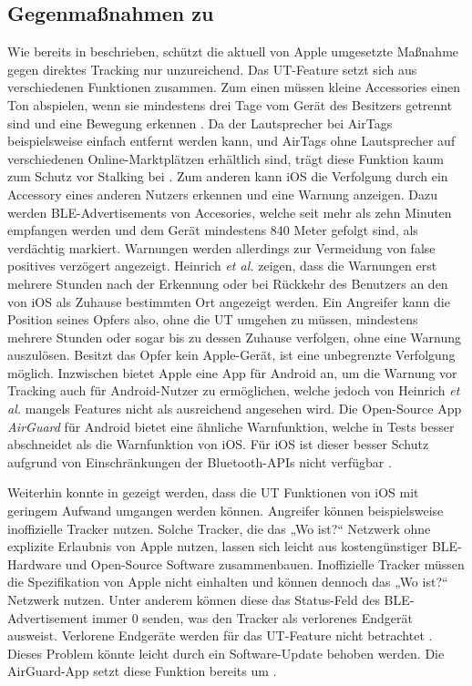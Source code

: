 \subsection{Gegenmaßnahmen zu }

Wie bereits in  beschrieben, schützt die aktuell von Apple umgesetzte Maßnahme gegen direktes Tracking nur unzureichend.
Das \ac{UT}-Feature setzt sich aus verschiedenen Funktionen zusammen.
Zum einen müssen kleine Accessories einen Ton abspielen, wenn sie mindestens drei Tage vom Gerät des Besitzers getrennt sind und eine Bewegung erkennen \cite{Apple_FindMySpec}.
Da der Lautsprecher bei AirTags beispielsweise einfach entfernt werden kann, und AirTags ohne Lautsprecher auf verschiedenen Online-Marktplätzen erhältlich sind, trägt diese Funktion kaum zum Schutz vor Stalking bei \cite{Heinrich_AirGuard}.
Zum anderen kann iOS die Verfolgung durch ein Accessory eines anderen Nutzers erkennen und eine Warnung anzeigen.
Dazu werden \ac{BLE}-Advertisements von Accesories, welche seit mehr als zehn Minuten empfangen werden und dem Gerät mindestens 840 Meter gefolgt sind, als verdächtig markiert.
Warnungen werden allerdings zur Vermeidung von false positives verzögert angezeigt.
Heinrich \textit{et al.} \cite{Heinrich_AirGuard} zeigen, dass die Warnungen erst mehrere Stunden nach der Erkennung oder bei Rückkehr des Benutzers an den von iOS als Zuhause bestimmten Ort angezeigt werden.
Ein Angreifer kann die Position seines Opfers also, ohne die \ac{UT} umgehen zu müssen, mindestens mehrere Stunden oder sogar bis zu dessen Zuhause verfolgen, ohne eine Warnung auszulösen.
Besitzt das Opfer kein Apple-Gerät, ist eine unbegrenzte Verfolgung möglich.
Inzwischen bietet Apple eine App für Android an, um die Warnung vor Tracking auch für Android-Nutzer zu ermöglichen, welche jedoch von Heinrich \textit{et al.} \cite{Heinrich_AirGuard} mangels Features nicht als ausreichend angesehen wird.
Die Open-Source App \textit{AirGuard} für Android bietet eine ähnliche Warnfunktion, welche in Tests besser abschneidet als die Warnfunktion von iOS.
Für iOS ist dieser besser Schutz aufgrund von Einschränkungen der Bluetooth-\acp{API} nicht verfügbar \cite{Heinrich_AirGuard}.

Weiterhin konnte in \cite{Heinrich_AirGuard,Mayberry_Tracking} gezeigt werden, dass die \ac{UT} Funktionen von iOS mit geringem Aufwand umgangen werden können.
Angreifer können beispielsweise inoffizielle Tracker nutzen.
Solche Tracker, die das „Wo ist?“ Netzwerk ohne explizite Erlaubnis von Apple nutzen, lassen sich leicht aus kostengünstiger \ac{BLE}-Hardware und Open-Source Software zusammenbauen.
Inoffizielle Tracker müssen die Spezifikation von Apple nicht einhalten und können dennoch das „Wo ist?“ Netzwerk nutzen.
Unter anderem können diese das Status-Feld des \ac{BLE}-Advertisement immer 0 senden, was den Tracker als verlorenes Endgerät ausweist.
Verlorene Endgeräte werden für das \ac{UT}-Feature nicht betrachtet \cite{Heinrich_AirGuard,Mayberry_Tracking}.
Dieses Problem könnte leicht durch ein Software-Update behoben werden.
Die AirGuard-App setzt diese Funktion bereits um \cite{Heinrich_AirGuard}.

